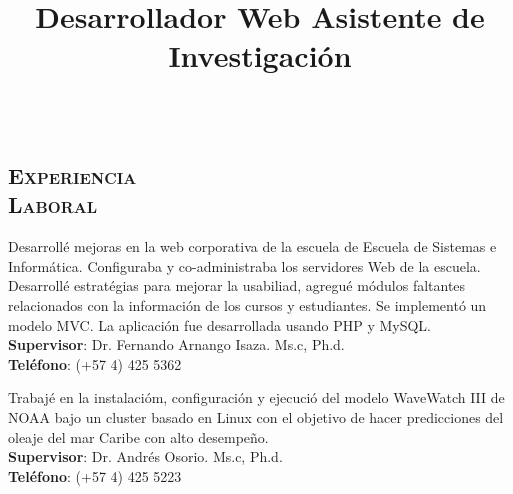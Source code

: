 \begin{resume}
\section{\textsc{\\Experiencia \\ Laboral}}

\title{\textbf{Desarrollador Web} }
\begin{position}
Desarroll\'{e} mejoras en la web corporativa de la escuela de Escuela
de Sistemas e Inform\'{a}tica. Configuraba y  co-administraba los
servidores Web de la escuela. Desarroll\'{e} estrat\'{e}gias para mejorar la usabiliad, agregu\'{e} m\'{o}dulos faltantes relacionados con la informaci\'{o}n de los cursos y estudiantes. Se implement\'{o} un modelo MVC. La aplicaci\'{o}n fue desarrollada usando PHP y MySQL.\\
\textbf{Supervisor}: Dr. Fernando Arnango Isaza. Ms.c, Ph.d.\\
\textbf{Tel\'{e}fono}: (+57 4) 425 5362 
\end{position}

\title{\textbf{Asistente de Investigaci\'{o}n}}
\begin{position}
Trabaj\'{e} en la instalaci\'{o}m, configuraci\'{o}n y ejecuci\'{o}  del modelo WaveWatch III de NOAA bajo un cluster basado en Linux con el objetivo de hacer predicciones del oleaje del mar Caribe con alto desempe\~{n}o.\\
\textbf{Supervisor}: Dr. Andr\'{e}s Osorio. Ms.c, Ph.d.\\
\textbf{Tel\'{e}fono}: (+57 4) 425 5223
\end{position}



\end{resume}
